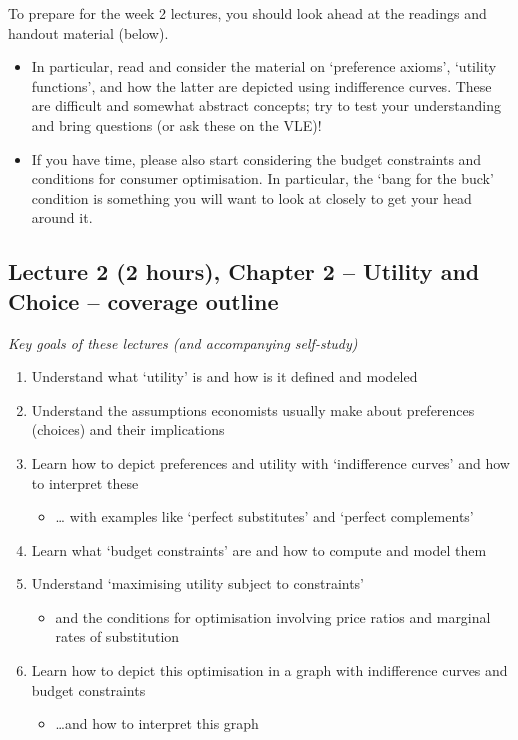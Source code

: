 \documentclass[]{article}
\providecommand{\tightlist}{%
  \setlength{\itemsep}{0pt}\setlength{\parskip}{0pt}}
\begin{document}
To prepare for the week 2 lectures, you should look ahead at the
readings and handout material (below).

\begin{itemize}
\item
  In particular, read and consider the material on `preference axioms',
  `utility functions', and how the latter are depicted using
  indifference curves. These are difficult and somewhat abstract
  concepts; try to test your understanding and bring questions (or ask
  these on the VLE)!
\item
  If you have time, please also start considering the budget constraints
  and conditions for consumer optimisation. In particular, the `bang for
  the buck' condition is something you will want to look at closely to
  get your head around it.
\end{itemize}

\hypertarget{lecture-2-2-hours-chapter-2-utility-and-choice-coverage-outline}{%
\subsection{Lecture 2 (2 hours), Chapter 2 -- Utility and Choice --
coverage
outline}\label{lecture-2-2-hours-chapter-2-utility-and-choice-coverage-outline}}

\emph{Key goals of these lectures (and accompanying self-study)}

\begin{enumerate}
\def\labelenumi{\arabic{enumi}.}
\tightlist
\item
  Understand what `utility' is and how is it defined and modeled
\item
  Understand the assumptions economists usually make about preferences
  (choices) and their implications
\item
  Learn how to depict preferences and utility with `indifference curves'
  and how to interpret these

  \begin{itemize}
  \tightlist
  \item
    \ldots{} with examples like `perfect substitutes' and `perfect
    complements'
  \end{itemize}
\item
  Learn what `budget constraints' are and how to compute and model them
\item
  Understand `maximising utility subject to constraints'

  \begin{itemize}
  \tightlist
  \item
    and the conditions for optimisation involving price ratios and
    marginal rates of substitution
  \end{itemize}
\item
  Learn how to depict this optimisation in a graph with indifference
  curves and budget constraints

  \begin{itemize}
  \tightlist
  \item
    \ldots and how to interpret this graph
  \end{itemize}
\end{enumerate}
\end{document}
